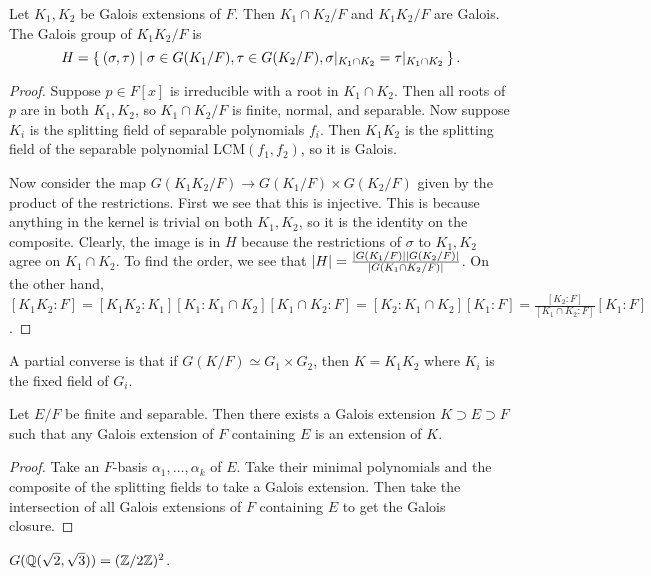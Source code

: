 \documentclass[10pt, twoside]{article}
\begin{document}
        \begin{prop}
            Let $K_1, K_2$ be Galois extensions of $F$. Then $K_1 \cap K_2/F$ and $K_1K_2/F$ are Galois.
            The Galois group of $K_1K_2/F$ is \[H = \Set{(\sigma, \tau)| \sigma \in G(K_1/F), \tau \in G(K_2/F), \sigma|_{K_1\cap K_2} = \tau|_{K_1 \cap K_2}}.\]
            \begin{proof}
                Suppose $p \in F[x]$ is irreducible with a root in $K_1 \cap K_2$. Then all roots of $p$ are in both $K_1, K_2$, so $K_1 \cap K_2/F$ is finite, normal, and separable. Now suppose $K_i$ is the splitting field of separable polynomials $f_i$. Then $K_1K_2$ is the splitting field of the separable polynomial $\mathrm{LCM}(f_1, f_2)$, so it is Galois.

                Now consider the map $G(K_1K_2/F) \to G(K_1/F) \times G(K_2/F)$ given by the product of the restrictions. First we see that this is injective. This is because anything in the kernel is trivial on both $K_1, K_2$, so it is the identity on the composite. Clearly, the image is in $H$ because the restrictions of $\sigma$ to $K_1, K_2$ agree on $K_1 \cap K_2$. To find the order, we see that $\lvert H\rvert = \frac{\lvert G(K_1/F)\rvert\lvert G(K_2/F)\rvert}{\lvert G(K_1\cap K_2 / F)\rvert}$. On the other hand, $[K_1K_2:F] = [K_1K_2:K_1][K_1:K_1 \cap K_2][K_1 \cap K_2:F] = [K_2:K_1 \cap K_2][K_1:F] = \frac{[K_2:F]}{[K_1 \cap K_2:F]}[K_1:F]$.
            \end{proof}
        \end{prop}

        A partial converse is that if $G(K/F) \simeq G_1 \times G_2$, then $K = K_1K_2$ where $K_i$ is the fixed field of $G_i$.

        \begin{cor}
            Let $E/F$ be finite and separable. Then there exists a Galois extension $K \supset E \supset F$ such that any Galois extension of $F$ containing $E$ is an extension of $K$.
            \begin{proof}
                Take an $F$-basis $\alpha_1, \ldots, \alpha_k$ of $E$. Take their minimal polynomials and the composite of the splitting fields to take a Galois extension. Then take the intersection of all Galois extensions of $F$ containing $E$ to get the Galois closure.
            \end{proof}
        \end{cor}

        \begin{exm}
            $G(\mathbb{Q}(\sqrt{2}, \sqrt{3})) = (\mathbb{Z}/2\mathbb{Z})^2$.
        \end{exm}
\end{document}
